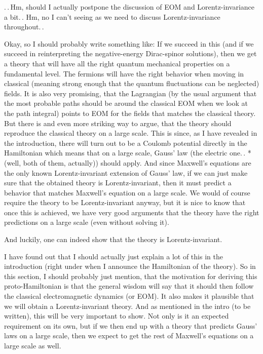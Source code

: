 \documentclass{report}
\begin{document}
.\,.\,Hm, should I actually postpone the discussion of EOM and Lorentz-invariance a bit.\,. Hm, no I can't seeing as we need to discuss Lorentz-invariance throughout.\,. 

Okay, so I should probably write something like: If we succeed in this (and if we succeed in reinterpreting the negative-energy Dirac-spinor solutions), then we get a theory that will have all the right quantum mechanical properties on a fundamental level. The fermions will have the right behavior when moving in classical (meaning strong enough that the quantum fluctuations can be neglected) fields. It is also very promising, that the Lagrangian (by the usual argument that the most probable paths should be around the classical EOM when we look at the path integral) points to EOM for the fields that matches the classical theory. But there is and even more striking way to argue, that the theory should reproduce the classical theory on a large scale. %
This is since, as I have revealed in the introduction, there will turn out to be a Coulomb potential directly in the Hamiltonian which means that on a large scale, Gauss' law (the electric one.\,. *(well, both of them, actually)) should apply. And since Maxwell's equations are the only known Lorentz-invariant extension of Gauss' law, if we can just make sure that the obtained theory is Lorentz-invariant, then it must predict a behavior that matches Maxwell's equation on a large scale. We would of course require the theory to be Lorentz-invariant anyway, but it is nice to know that once this is achieved, we have very good arguments that the theory have the right predictions on a large scale (even without solving it). 

And luckily, one can indeed show that the theory is Lorentz-invariant. 

I have found out that I should actually just explain a lot of this in the introduction (right under when I announce the Hamiltonian of the theory). So in this section, I should probably just mention, that the motivation for deriving this proto-Hamiltonian is that the general wisdom will say that it should then follow the classical electromagnetic dynamics (or EOM). It also makes it plausible that we will obtain a Lorentz-invariant theory. And as mentioned in the intro (to be written), this will be very important to show. Not only is it an expected requirement on its own, but if we then end up with a theory that predicts Gauss' laws on a large scale, then we expect to get the rest of Maxwell's equations on a large scale as well. 
\end{document}
